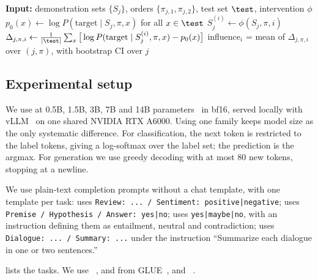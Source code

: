 \begin{algorithm}[t]
\caption{Causal position-influence probe}
\label{alg:probe}
\begin{algorithmic}[1]
\State \textbf{Input:} demonstration sets $\{S_j\}$, orders $\{\pi_{j,1},\pi_{j,2}\}$, test set $\test$, intervention $\phi$
    \State $p_0(x) \gets \log P(\text{target}\mid S_j,\pi,x)$ for all $x\in\test$ 
        \State $S_j^{(i)} \gets \phi(S_j,\pi,i)$ 
        \State $\Delta_{j,\pi,i} \gets \frac{1}{|\test|}\sum_{x} \big[\log P(\text{target}\mid S_j^{(i)},\pi,x) - p_0(x)\big]$
    \EndFor
\EndFor
\State \Return influence$_i$ = mean of $\Delta_{j,\pi,i}$ over $(j,\pi)$, with bootstrap CI over $j$
\end{algorithmic}
\end{algorithm}

\subsection{Experimental setup}

We use \qwen at 0.5B, 1.5B, 3B, 7B and 14B parameters~\cite{qwen2025qwen25} in bf16, served locally with vLLM~\cite{kwon2023efficient} on one shared NVIDIA RTX A6000.
Using one family keeps model size as the only systematic difference.
For classification, the next token is restricted to the label tokens, giving a log-softmax over the label set; the prediction is the argmax.
For generation we use greedy decoding with at most 80 new tokens, stopping at a newline.

We use plain-text completion prompts without a chat template, with one template per task:
\sst uses \texttt{Review: ... / Sentiment: positive|negative};
\rte uses \texttt{Premise / Hypothesis / Answer: yes|no};
\mnli uses \texttt{yes|maybe|no}, with an instruction defining them as entailment, neutral and contradiction;
\samsum uses \texttt{Dialogue: ... / Summary: ...} under the instruction ``Summarize each dialogue in one or two sentences.''

 lists the tasks. We use \sst~\cite{socher2013recursive}, \rte and \mnli from GLUE~\cite{wang2018glue,williams2018broad}, and \samsum~\cite{gliwa2019samsum}.

